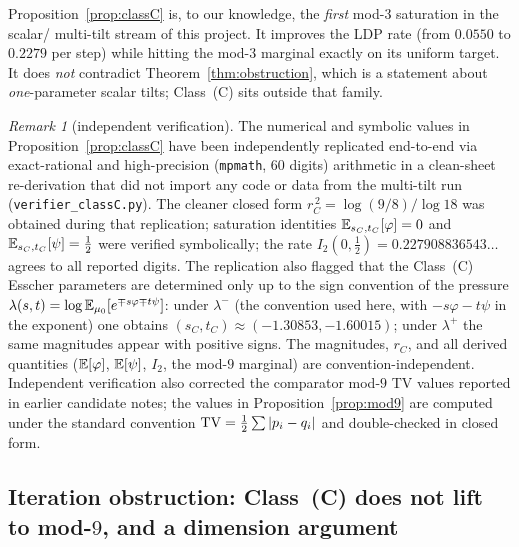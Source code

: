 \documentclass[11pt]{amsart}
\theoremstyle{definition}
\theoremstyle{remark}
\newtheorem{remark}[theorem]{Remark}
\begin{document}
Proposition~\ref{prop:classC} is, to our knowledge, the \emph{first} mod-$3$ saturation in the scalar/
multi-tilt stream of this project. It improves the LDP rate (from $0.0550$ to $0.2279$ per step) while
hitting the mod-$3$ marginal exactly on its uniform target. It does \emph{not} contradict
Theorem~\ref{thm:obstruction}, which is a statement about \emph{one}-parameter scalar tilts; Class~(C)
sits outside that family.

\begin{remark}[independent verification]\label{rem:verifier}
The numerical and symbolic values in Proposition~\ref{prop:classC} have been independently replicated
end-to-end via exact-rational and high-precision (\texttt{mpmath}, $60$ digits) arithmetic in a
clean-sheet re-derivation that did not import any code or data from the multi-tilt run
(\texttt{verifier\_classC.py}). The cleaner closed form $r_C^{\,2}=\log(9/8)/\log 18$ was obtained
during that replication; saturation identities $\mathbb{E}_{s_C,t_C}[\varphi]=0$ and $\mathbb{E}_{s_C,t_C}[\psi]=\tfrac12$
were verified symbolically; the rate $I_2(0,\tfrac12)=0.227908836543\ldots$ agrees to all reported
digits. The replication also flagged that the Class~(C) Esscher parameters are determined only up to
the sign convention of the pressure $\lambda(s,t)=\log\mathbb{E}_{\mu_0}[e^{\mp s\varphi\mp t\psi}]$: under
$\lambda^-$ (the convention used here, with $-s\varphi-t\psi$ in the exponent) one obtains
$(s_C,t_C)\approx(-1.30853,-1.60015)$; under $\lambda^+$ the same magnitudes appear with positive
signs. The magnitudes, $r_C$, and all derived quantities ($\mathbb{E}[\varphi]$, $\mathbb{E}[\psi]$, $I_2$, the
mod-$9$ marginal) are convention-independent. Independent verification also corrected the comparator
mod-$9$ TV values reported in earlier candidate notes; the values in Proposition~\ref{prop:mod9} are
computed under the standard convention $\mathrm{TV}=\tfrac12\sum|p_i-q_i|$ and double-checked in
closed form.
\end{remark}

\subsection{Iteration obstruction: Class~(C) does not lift to mod-$9$, and a dimension argument}
\end{document}
